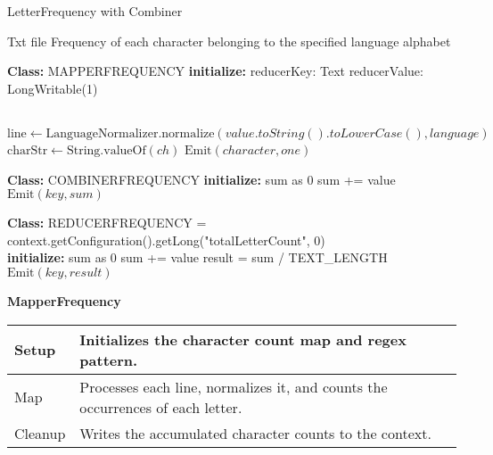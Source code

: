 \begin{algorithm}
    \caption{LetterFrequency with Combiner}
    \begin{algorithmic}[1]
    \Require Txt file
    \Ensure Frequency of each character belonging to the specified language alphabet
    \\
    \Statex
    
    \textbf{Class:} MAPPERFREQUENCY
    \State \textbf{initialize:}
    \State  reducerKey: Text
    \State  reducerValue: LongWritable(1) \\
    

    \EndProcedure\\
    
        \State $\text{line} \gets \text{LanguageNormalizer.normalize}(value.toString().toLowerCase(), language)$
                \State $\text{charStr} \gets \text{String.valueOf}(ch)$
                \State $\text{Emit}(character, one)$
        \EndFor
    \EndProcedure\\
    
    \Statex
    
    \textbf{Class:} COMBINERFREQUENCY
        \State \textbf{initialize:} sum as 0
            \State sum += value
        \EndFor
        \State $\text{Emit}(key, sum)$
    \EndProcedure\\
    
    \Statex
    
    \textbf{Class:} REDUCERFREQUENCY
        \State {} = context.getConfiguration().getLong("totalLetterCount", 0)
    \EndProcedure\\
    
        \State \textbf{initialize:} sum as 0
            \State sum += value
        \EndFor
        \State result = sum / TEXT\_LENGTH
        \State $\text{Emit}(key, result)$
    \EndProcedure
    
    \end{algorithmic}
    \end{algorithm}


\textbf{MapperFrequency}
\begin{longtable}{|>{\raggedright\arraybackslash}p{}|>{\raggedright\arraybackslash}p{}|}
    \hline
    Setup &   Initializes the character count map and regex pattern.\\
    \hline
    Map &  Processes each line, normalizes it, and counts the occurrences of each letter.\\
    \hline
    Cleanup & Writes the accumulated character counts to the context.\\
    \hline
\end{longtable}


